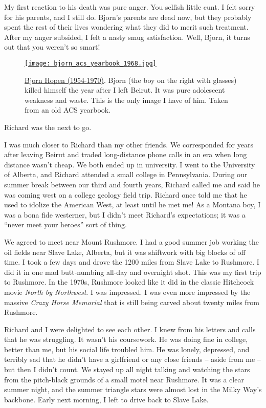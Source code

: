 My first reaction to his death was pure anger. You selfish little cunt.
I felt sorry for his parents, and I still do. Bjorn's parents are dead
now, but they probably spent the rest of their lives wondering what they
did to merit such treatment. After my anger subsided, I felt a nasty
smug satisfaction. Well, Bjorn, it turns out that you weren't so smart!

\captionsetup[figure]{labelformat=empty}
\begin{SCfigure}
\centering
\href{https://conceptcontrol.smugmug.com/Places/Overseas/Beirut-Lebanon-1960s-1/i-xRLzQPh/A}{\texttt{[image: bjorn\_acs\_yearbook\_1968.jpg]}}
\caption[Bjorn Hopen (1954-1970)]{\href{https://www.findagrave.com/memorial/244135118/bjorn_erik-hopen/flower}{Bjorn Hopen (1954-1970)}. Bjorn (the boy on the right with glasses) killed himself the year after I left Beirut.
It was pure adolescent weakness and waste. This is the only image I have
of him. Taken from an old ACS yearbook.}
\label{fig:8196x0}
\end{SCfigure}

Richard was the next to go.

I was much closer to Richard than my other friends. We corresponded for
years after leaving Beirut and traded long-distance phone calls in an
era when long distance wasn't cheap. We both ended up in university. I
went to the University of Alberta, and Richard attended a small college
in Pennsylvania. During our summer break between our third and fourth
years, Richard called me and said he was coming west on a college
geology field trip. Richard once told me that he used to idolize the
American West, at least until he met me! As a Montana boy, I was a bona
fide westerner, but I didn't meet Richard's expectations; it was a
``never meet your heroes'' sort of thing.

We agreed to meet near Mount Rushmore. I had a good summer job working
the oil fields near Slave Lake, Alberta, but it was shiftwork with big
blocks of off time. I took a few days and drove the 1200 miles from
Slave Lake to Rushmore. I did it in one mad butt-numbing all-day and
overnight shot. This was my first trip to Rushmore. In the 1970s,
Rushmore looked like it did in the classic Hitchcock movie \emph{North
by Northwest}. I was impressed. I was even more impressed by the massive
\emph{Crazy Horse Memorial} that is still being carved about twenty
miles from Rushmore.

Richard and I were delighted to see each other. I knew from his letters
and calls that he was struggling. It wasn't his coursework. He was doing
fine in college, better than me, but his social life troubled him. He
was lonely, depressed, and terribly sad that he didn't have a girlfriend
or any close friends -- aside from me -- but then I didn't count. We
stayed up all night talking and watching the stars from the pitch-black
grounds of a small motel near Rushmore. It was a clear summer night, and
the summer triangle stars were almost lost in the Milky Way's backbone.
Early next morning, I left to drive back to Slave Lake.

